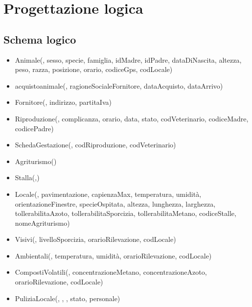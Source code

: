 \documentclass[12pt,a4paper]{article}
\begin{document}
\pagebreak
\section{Progettazione logica}

\subsection{Schema logico}

\begin{itemize}

\item Animale(\underline{}, sesso, specie, famiglia, idMadre, idPadre, dataDiNascita, altezza, peso, razza, posizione, orario,  codiceGps,  codLocale)
\item acquistoanimale(\underline{}, ragioneSocialeFornitore,  dataAcquisto,  dataArrivo)
\item Fornitore(\underline{}, indirizzo, partitaIva)
\item Riproduzione(\underline{}, complicanza, orario, data, stato,  codVeterinario, codiceMadre, codicePadre)
\item SchedaGestazione(\underline{},  codRiproduzione,  codVeterinario)
\item Agriturismo(\underline{})
\item Stalla(\underline{},\underline{})
\item Locale(\underline{}, pavimentazione, capienzaMax, temperatura, umidità, orientazioneFinestre, specieOspitata, altezza, lunghezza, larghezza, tollerabilitaAzoto, tollerabilitaSporcizia, tollerabilitaMetano, codiceStalle, nomeAgriturismo)
\item Visivi(\underline{}, livelloSporcizia,  orarioRilevazione,  codLocale)
\item Ambientali(\underline{}, temperatura, umidità,  orarioRilevazione,  codLocale)
\item CompostiVolatili(\underline{}, concentrazioneMetano, concentrazioneAzoto,  orarioRilevazione, codLocale)
\item PuliziaLocale(\underline{}, \underline{}, \underline{}, stato, personale)

\end{itemize}
\end{document}
